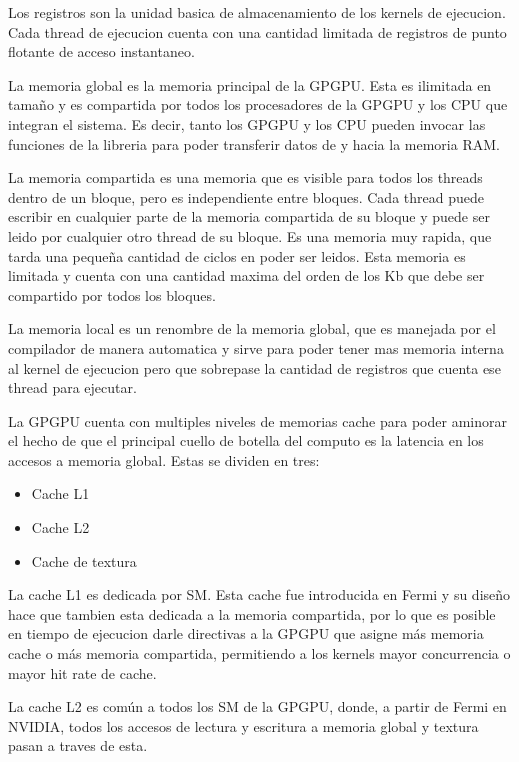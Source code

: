 Los registros son la unidad basica de almacenamiento de los kernels de ejecucion.
Cada thread de ejecucion cuenta con una cantidad limitada de registros de punto flotante de
acceso instantaneo.

La memoria global es la memoria principal de la GPGPU. Esta es ilimitada en tama\~no
y es compartida por todos los procesadores de la GPGPU y los CPU que integran el
sistema. Es decir, tanto los GPGPU y los CPU pueden invocar las funciones de la libreria
para poder transferir datos de y hacia la memoria RAM.

La memoria compartida es una memoria que es visible para todos los threads dentro
de un bloque, pero es independiente entre bloques. Cada thread puede escribir en cualquier
parte de la memoria compartida de su bloque y puede ser leido por cualquier otro thread
de su bloque. Es una memoria muy rapida, que tarda una peque\~na cantidad de ciclos
en poder ser leidos. Esta memoria es limitada y cuenta con una cantidad maxima del orden de los
Kb que debe ser compartido por todos los bloques.

La memoria local es un renombre de la memoria global, que es manejada por el compilador
de manera automatica y sirve para poder tener mas memoria interna al kernel de ejecucion
pero que sobrepase la cantidad de registros que cuenta ese thread para ejecutar.

La GPGPU cuenta con multiples niveles de memorias cache para poder aminorar el hecho
de que el principal cuello de botella del computo es la latencia en los accesos a memoria
global. Estas se dividen en tres:

\begin{itemize}
  \item Cache L1
  \item Cache L2
  \item Cache de textura
\end{itemize}

La cache L1 es dedicada por SM. Esta cache fue introducida en Fermi y su dise\~no hace que
tambien esta dedicada a la memoria compartida, por lo que es posible en tiempo de ejecucion
darle directivas a la GPGPU que asigne m\'as memoria cache o m\'as memoria compartida,
permitiendo a los kernels mayor concurrencia o mayor hit rate de cache.

La cache L2 es com\'un a todos los SM de la GPGPU, donde, a partir de Fermi en NVIDIA, todos
los accesos de lectura y escritura a memoria global y textura pasan a traves de esta.

